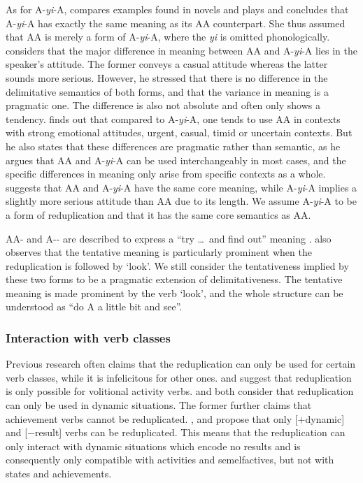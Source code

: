As for A-\textit{yi}-A, \citet[273]{Fan1964} compares examples found in novels and plays and concludes that A-\textit{yi}-A has exactly the same meaning as its AA counterpart.
She thus assumed that AA is merely a form of A-\textit{yi}-A, where the \textit{yi} is omitted phonologically.
\citet[Sec. 5]{Xing2000} considers that the major  difference in meaning  between AA and A-\textit{yi}-A lies in the speaker's attitude.
The former conveys a casual attitude whereas the latter sounds more serious.%
However, he stressed that there is no difference in the delimitative semantics of both forms,
and that the variance in meaning is a pragmatic one.
The difference is also not absolute and often only shows a tendency.
\citet{Xu2002} finds out that compared to A-\textit{yi}-A, one tends to use AA in contexts with strong emotional attitudes, urgent, casual, timid or uncertain contexts.
But he also states that these differences are pragmatic rather than semantic, 
as he argues that AA and A-\textit{yi}-A can be used interchangeably in most cases,
and the specific differences in meaning only arise from specific contexts as a whole.
\citet[15]{Yang2003} suggests that AA and A-\textit{yi}-A have the same core meaning, while A-\textit{yi}-A implies a slightly more serious attitude than AA due to its length.
We assume A-\textit{yi}-A to be a form of reduplication and that it has the same core semantics as AA.

AA- and A-- are described to express a ``try \ldots\, and find out'' meaning \citep[63]{Cheng2012}.
\citet[290]{Tsao2001} also observes that the tentative meaning is particularly prominent when the reduplication is followed by  `look'.
We still consider the tentativeness implied by these two forms to be a pragmatic extension of delimitativeness.
The tentative meaning is made prominent by the verb  `look',
and the whole structure can be understood as ``do A a little bit and see''.




\subsubsection{Interaction with verb classes}\label{sec:Aktionsarten}

Previous research often claims that the reduplication can only be used for certain verb classes, while it is infelicitous for other ones.
 \citet[234--235]{LiThompson1981} and \citet[277--278]{Hong1999} suggest that reduplication is only possible for volitional activity verbs.
\citet[70--71]{Dai1997} and \citet[290]{Tsao2001} both consider that reduplication can only be used in dynamic situations.
The former further claims that achievement verbs cannot be reduplicated.
 \citet[155]{XiaoMcEnery2004}, \citet[20]{Arcodiaetal2014} and \citet[145]{BascianoMelloni2017} propose that only [$+$dynamic] and [$-$result] verbs can be reduplicated.
This means that the reduplication can only interact with dynamic situations which encode no results and is consequently only compatible with activities and semelfactives, but not with states and achievements.


